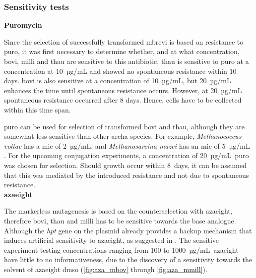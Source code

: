 




\subsubsection{Sensitivity tests}

\textbf{Puromycin}

\noindent Since the \gls{selection} of successfully transformed \acrlong{mbrevi} is based on resistance to \acrfull{puro}, it was first necessary to determine whether, and at what concentration, \acrshort{bovi}, \acrshort{milli} and \acrshort{thau} are sensitive to this antibiotic.
\acrshort{thau} is sensitive to \acrshort{puro} at a concentration at 10~µg/mL and showed no spontaneous resistance within 10 days. \acrshort{bovi} is also sensitive at a concentration of 10~µg/mL, but 20~µg/mL enhances the time until spontaneous resistance occurs. However, at 20~µg/mL spontaneous resistance occurred after 8 days. Hence, cells have to be collected within this time span.

\Acrshort{puro} can be used for selection of transformed \acrshort{bovi} and \acrshort{thau}, although they are somewhat less sensitive than other \gls{archa} species. For example, \textit{Methanococcus voltae} has a \acrfull{mic} of 2~µg/mL, and \textit{Methanosarcina mazei} has an \acrshort{mic} of 5~µg/mL \parencite{possotAnalysisDrugResistance1988, mondorfNovelInducibleProtein2012}. For the upcoming conjugation experiments, a concentration of 20~µg/mL~\acrshort{puro} was chosen for selection. Should growth occur within 8~days, it can be assumed that this was mediated by the introduced resistance and not due to spontaneous resistance.\\

\textbf{\acrshort{azaeight}}

\noindent The \gls{markerless} mutagenesis is based on the \gls{counterselection} with \acrshort{azaeight}, therefore \acrshort{bovi}, \acrshort{thau} and \acrshort{milli} has to be sensitive towards the base analogue. Although the \textit{hpt} gene on the plasmid already provides a backup mechanism that induces artificial sensitivity to \acrshort{azaeight}, as suggested in \textcite{kleinMarkerlessMutagenesisEnables2025}. The sensitive experiment testing concentrations ranging from 100 to 1000~µg/mL~\acrshort{azaeight} have little to no informativeness, due to the discovery of a sensitivity towards the solvent of \acrshort{azaeight} \acrfull{dmso} (\cref{fig:aza_mbov} through \cref{fig:aza_mmill}).

